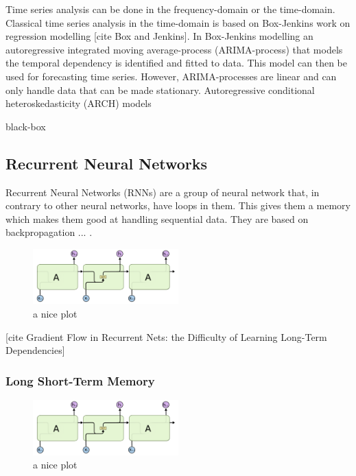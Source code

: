 Time series analysis can be done in the frequency-domain or the time-domain. Classical time series analysis in the time-domain is based on Box-Jenkins work on regression modelling [cite Box and Jenkins]. In Box-Jenkins modelling an autoregressive integrated moving average-process (ARIMA-process) that models the temporal dependency is identified and fitted to data. This model can then be used for forecasting time series. However, ARIMA-processes are linear and can only handle data that can be made stationary. Autoregressive conditional heteroskedasticity (ARCH) models   

 

 black-box
 

\subsection{Recurrent Neural Networks}
Recurrent Neural Networks (RNNs) are a group of neural network that, in contrary to other neural networks, have loops in them. This gives them a memory which makes them good at handling sequential data. They are based on backpropagation ... \cite{Rumelhart1986}.

\begin{figure}[h]
    \centering
    \includegraphics[width=0.5\textwidth]{Report/Chapters/Images/RNN.png}
    \caption{a nice plot}
    \label{fig:mesh1}
\end{figure}

[cite Gradient Flow in Recurrent Nets: the Difficulty of Learning Long-Term Dependencies]



\subsubsection{Long Short-Term Memory}

\begin{figure}[h]
    \centering
    \includegraphics[width=0.5\textwidth]{Report/Chapters/Images/RNN.png}
    \caption{a nice plot}
    \label{fig:mesh1}
\end{figure}
